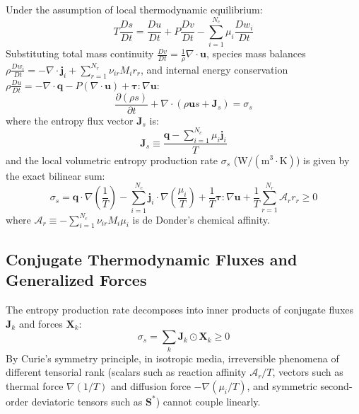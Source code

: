 \documentclass[11pt,a4paper]{article}
\begin{document}
Under the assumption of local thermodynamic equilibrium:
\begin{equation}
T \frac{Ds}{Dt} = \frac{Du}{Dt} + P \frac{Dv}{Dt} - \sum_{i=1}^{N_c} \mu_i \frac{Dw_i}{Dt}
\end{equation}
Substituting total mass continuity $\frac{Dv}{Dt} = \frac{1}{\rho}\nabla \cdot \mathbf{u}$, species mass balances $\rho \frac{Dw_i}{Dt} = -\nabla \cdot \mathbf{j}_i + \sum_{r=1}^{N_r} \nu_{ir} M_i r_r$, and internal energy conservation $\rho \frac{Du}{Dt} = -\nabla \cdot \mathbf{q} - P (\nabla \cdot \mathbf{u}) + \boldsymbol{\tau} : \nabla \mathbf{u}$:
\begin{equation}
\frac{\partial (\rho s)}{\partial t} + \nabla \cdot \left( \rho \mathbf{u} s + \mathbf{J}_s \right) = \sigma_s
\end{equation}
where the entropy flux vector $\mathbf{J}_s$ is:
\begin{equation}
\mathbf{J}_s \equiv \frac{\mathbf{q} - \sum_{i=1}^{N_c} \mu_i \mathbf{j}_i}{T}
\end{equation}
and the local volumetric entropy production rate $\sigma_s$ ($\text{W}/(\text{m}^3\cdot\text{K})$) is given by the exact bilinear sum:
\begin{equation}
\sigma_s = \mathbf{q} \cdot \nabla \left(\frac{1}{T}\right) - \sum_{i=1}^{N_c} \mathbf{j}_i \cdot \nabla \left(\frac{\mu_i}{T}\right) + \frac{1}{T} \boldsymbol{\tau} : \nabla \mathbf{u} + \frac{1}{T} \sum_{r=1}^{N_r} \mathcal{A}_r r_r \ge 0
\end{equation}
where $\mathcal{A}_r \equiv -\sum_{i=1}^{N_c} \nu_{ir} M_i \mu_i$ is de Donder's chemical affinity.

\subsection{Conjugate Thermodynamic Fluxes and Generalized Forces}
\label{subsec:conjugate-fluxes-forces}

The entropy production rate decomposes into inner products of conjugate fluxes $\mathbf{J}_k$ and forces $\mathbf{X}_k$:
\begin{equation}
\sigma_s = \sum_k \mathbf{J}_k \odot \mathbf{X}_k \ge 0
\end{equation}
By Curie's symmetry principle, in isotropic media, irreversible phenomena of different tensorial rank (scalars such as reaction affinity $\mathcal{A}_r/T$, vectors such as thermal force $\nabla(1/T)$ and diffusion force $-\nabla(\mu_i/T)$, and symmetric second-order deviatoric tensors such as $\mathbf{S}^*$) cannot couple linearly.
\end{document}
